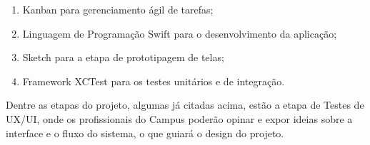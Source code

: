 \begin{enumerate}
    \item Kanban para gerenciamento ágil de tarefas;
    \item Linguagem de Programação Swift para o desenvolvimento da aplicação;
    \item Sketch para a etapa de prototipagem de telas;
    \item Framework XCTest para os testes unitários e de integração.
\end{enumerate}

Dentre as etapas do projeto, algumas já citadas acima, estão a etapa de Testes de UX/UI, onde os profissionais do Campus poderão opinar e expor ideias sobre a interface e o fluxo do sistema, o que guiará o design do projeto.